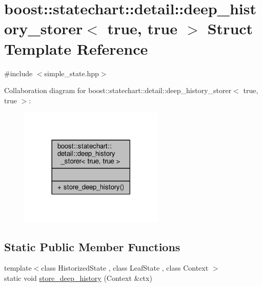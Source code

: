 \hypertarget{structboost_1_1statechart_1_1detail_1_1deep__history__storer_3_01true_00_01true_01_4}{}\section{boost\+:\+:statechart\+:\+:detail\+:\+:deep\+\_\+history\+\_\+storer$<$ true, true $>$ Struct Template Reference}
\label{structboost_1_1statechart_1_1detail_1_1deep__history__storer_3_01true_00_01true_01_4}


{\ttfamily \#include $<$simple\+\_\+state.\+hpp$>$}



Collaboration diagram for boost\+:\+:statechart\+:\+:detail\+:\+:deep\+\_\+history\+\_\+storer$<$ true, true $>$\+:
\nopagebreak
\begin{figure}[H]
\begin{center}
\leavevmode
\includegraphics[width=194pt]{structboost_1_1statechart_1_1detail_1_1deep__history__storer_3_01true_00_01true_01_4__coll__graph}
\end{center}
\end{figure}
\subsection*{Static Public Member Functions}
\begin{DoxyCompactItemize}
\item 
{\footnotesize template$<$class Historized\+State , class Leaf\+State , class Context $>$ }\\static void \mbox{\hyperlink{structboost_1_1statechart_1_1detail_1_1deep__history__storer_3_01true_00_01true_01_4_aa604cfd689442a9785a685cd003efe21}{store\+\_\+deep\+\_\+history}} (Context \&ctx)
\end{DoxyCompactItemize}


